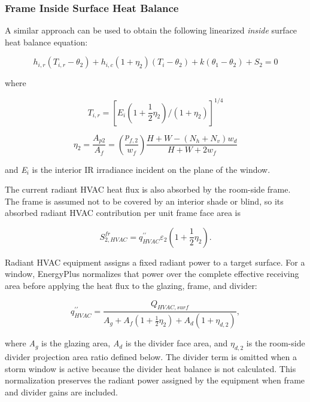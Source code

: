 \subsubsection{Frame Inside Surface Heat Balance}\label{frame-inside-surface-heat-balance}

A similar approach can be used to obtain the following linearized \emph{inside} surface heat balance equation:

\begin{equation}
{h_{i,r}}({T_{i,r}} - {\theta_2}) + {h_{i,c}}(1 + {\eta_2})({T_i} - {\theta_2}) + k({\theta_1} - {\theta_2}) + {S_2} = 0
\label{eq:hirEquation}
\end{equation}

where

\begin{equation}
{T_{i,r}} = {[{E_i}(1 + \frac{1}{2}{\eta_2})/(1 + {\eta_2})]^{1/4}}
\end{equation}

\begin{equation}
{\eta_2} = \frac{{{A_{p2}}}}{{{A_f}}} = \left( {\frac{{{p_{f,2}}}}{{{w_f}}}} \right)\frac{{H + W - ({N_h} + {N_v}){w_d}}}{{H + W + 2{w_f}}}
\end{equation}

and \emph{E\(_{i}\)} is the interior IR irradiance incident on the plane of the window.

The current radiant HVAC heat flux is also absorbed by the room-side frame. The frame is assumed not to be covered by an interior shade or blind, so its absorbed radiant HVAC contribution per unit frame face area is

\begin{equation}
S_{2,HVAC}^{fr} = q^{\prime\prime}_{HVAC}{\varepsilon_2}\left( {1 + \frac{1}{2}{\eta_2}} \right).
\end{equation}

Radiant HVAC equipment assigns a fixed radiant power to a target surface. For a window, EnergyPlus normalizes that power over the complete effective receiving area before applying the heat flux to the glazing, frame, and divider:

\begin{equation}
q^{\prime\prime}_{HVAC} = \frac{Q_{HVAC,surf}}{A_g + A_f\left(1 + \frac{1}{2}\eta_2\right) + A_d\left(1 + \eta_{d,2}\right)},
\end{equation}

where \emph{A\(_g\)} is the glazing area, \emph{A\(_d\)} is the divider face area, and \emph{\(\eta_{d,2}\)} is the room-side divider projection area ratio defined below. The divider term is omitted when a storm window is active because the divider heat balance is not calculated. This normalization preserves the radiant power assigned by the equipment when frame and divider gains are included.

